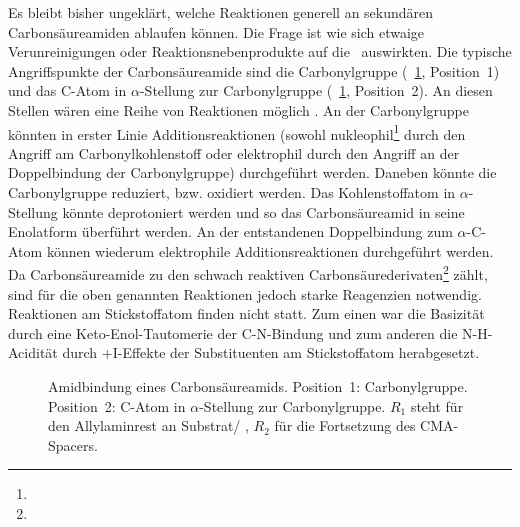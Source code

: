 Es bleibt bisher ungeklärt, welche Reaktionen generell an sekundären Carbonsäureamiden ablaufen können. Die Frage ist wie sich etwaige Verunreinigungen oder Reaktionsnebenprodukte auf die \amid~auswirkten. Die typische Angriffspunkte der Carbonsäureamide sind die Carbonylgruppe (\abb~\ref{fig:amidbindung}, Position~1) und das C-Atom in $\alpha$-Stellung zur Carbonylgruppe (\abb~\ref{fig:amidbindung}, Position~2). An diesen Stellen wären eine Reihe von Reaktionen möglich \cite[305-308]{Latscha.2016}. An der Carbonylgruppe könnten in erster Linie Additionsreaktionen (sowohl nukleophil\footnote{\noteTwo} durch den Angriff am Carbonylkohlenstoff oder elektrophil durch den Angriff an der Doppelbindung der Carbonylgruppe) durchgeführt werden. Daneben könnte die Carbonylgruppe reduziert, bzw. oxidiert werden. Das Kohlenstoffatom in $\alpha$-Stellung könnte deprotoniert werden und so das Carbonsäureamid in seine Enolatform überführt werden. An der entstandenen Doppelbindung zum $\alpha$-C-Atom können wiederum elektrophile Additionsreaktionen durchgeführt werden. Da Carbonsäureamide zu den schwach reaktiven Carbonsäurederivaten\footnote{\noteThree} zählt, sind für die oben genannten Reaktionen jedoch starke Reagenzien notwendig. Reaktionen am Stickstoffatom finden nicht statt. Zum einen war die Basizität durch eine Keto-Enol-Tautomerie der C-N-Bindung und zum anderen die N-H-Acidität durch +I-Effekte der Substituenten am Stickstoffatom herabgesetzt. 

\begin{figure}[h]
	\centering
	\caption[Amidbindung eines Carbonsäureamids]{Amidbindung eines Carbonsäureamids. Position~1: Carbonylgruppe. Position~2: C-Atom in $\alpha$-Stellung zur Carbonylgruppe. $R_1$ steht für den Allylaminrest an Substrat/ \spitze, $R_2$ für die Fortsetzung des \acs*{CMA}-Spacers.}
	\label{fig:amidbindung}
\end{figure}

